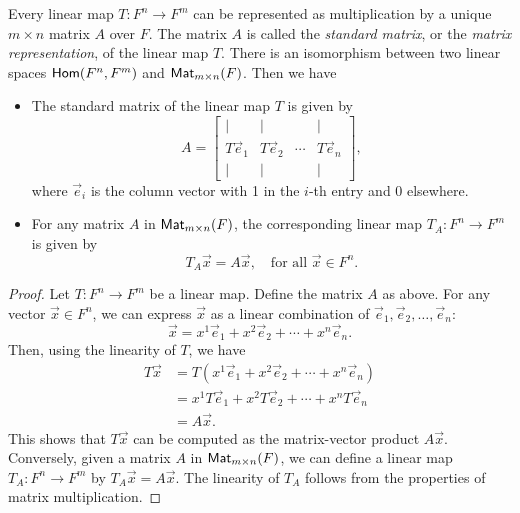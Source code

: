 \begin{proposition}
  Every linear map $T \colon F^n \to F^m$ can be represented as multiplication by a unique $m \times n$ matrix $A$ over $F$. The matrix $A$ is called the \emph{standard matrix}, or the \emph{matrix representation}, of the linear map $T$. There is an isomorphism between two linear spaces $\operatorname{\text{\normalfont\sffamily Hom}}(F^n, F^m)$ and $\operatorname{\text{\normalfont\sffamily Mat}}_{m \times n}(F)$. Then we have
  \begin{itemize}
    \item The standard matrix of the linear map $T$ is given by
          \[
            A = \begin{bmatrix}
              |          & |          &        & |          \\
              T\vec{e}_1 & T\vec{e}_2 & \cdots & T\vec{e}_n \\
              |          & |          &        & |
            \end{bmatrix},
          \]
          where $\vec{e}_i$ is the column vector with 1 in the $i$-th entry and 0 elsewhere.
    \item For any matrix $A$ in $\operatorname{\text{\normalfont\sffamily Mat}}_{m \times n}(F)$, the corresponding linear map $T_A \colon F^n \to F^m$ is given by
          \[
            T_A \vec{x} = A \vec{x}, \quad \text{for all } \vec{x} \in F^n.
          \]
  \end{itemize}
\end{proposition}
\begin{proof}
  Let $T \colon F^n \to F^m$ be a linear map. Define the matrix $A$ as above. For any vector $\vec{x} \in F^n$, we can express $\vec{x}$ as a linear combination of $\vec{e}_1, \vec{e}_2, \ldots, \vec{e}_n$:
  \[
    \vec{x} = x^1 \vec{e}_1 + x^2 \vec{e}_2 + \cdots + x^n \vec{e}_n.
  \]
  Then, using the linearity of $T$, we have
  \begin{align*}
    T\vec{x} & = T(x^1 \vec{e}_1 + x^2 \vec{e}_2 + \cdots + x^n \vec{e}_n) \\
             & = x^1 T\vec{e}_1 + x^2 T\vec{e}_2 + \cdots + x^n T\vec{e}_n \\
             & = A \vec{x}.
  \end{align*}
  This shows that $T\vec{x}$ can be computed as the matrix-vector product $A\vec{x}$. Conversely, given a matrix $A$ in $\operatorname{\text{\normalfont\sffamily Mat}}_{m \times n}(F)$, we can define a linear map $T_A \colon F^n \to F^m$ by $T_A \vec{x} = A \vec{x}$. The linearity of $T_A$ follows from the properties of matrix multiplication.
\end{proof}

